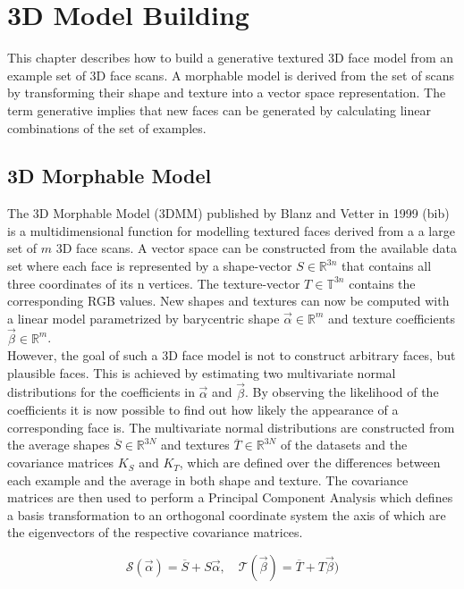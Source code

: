 \chapter{3D Model Building}
This chapter describes how to build a generative textured 3D face model from an example set of 3D face scans. A morphable model is derived from the set of scans by transforming their shape and texture into a vector space representation. The term generative implies that new faces can be generated by calculating linear combinations of the set of examples. 

\section{3D Morphable Model}
The 3D Morphable Model (3DMM) published by Blanz and Vetter in 1999 (bib) is a multidimensional function for modelling textured faces derived from a a large set of $m$ 3D face scans. A vector space can be constructed from the available data set where each face is represented by a shape-vector $S \in \mathbb{R}^{3n}$ that contains all three coordinates of its n vertices. The texture-vector $T \in \mathbb{T}^{3n}$ contains the corresponding RGB values. New shapes and textures can now be computed
with a linear model parametrized by barycentric shape $\vec\alpha \in \mathbb{R}^{m}$ and texture coefficients $\vec\beta \in \mathbb{R}^{m}$.\\
However, the goal of such a 3D face model is not to construct arbitrary faces, but plausible faces. This is achieved by estimating two multivariate normal distributions for the coefficients in $\vec\alpha$ and $\vec\beta$.
By observing the likelihood of the coefficients it is now possible to find out how likely the appearance of a corresponding face is.
The multivariate normal distributions are constructed from the average shapes $\overline{S} \in \mathbb{R}^{3N}$ and textures $\overline{T} \in \mathbb{R}^{3N}$ of the datasets and the covariance matrices $K_{S}$ and $K_{T}$, which are defined over the differences between each example and the average in both shape and texture.
The covariance matrices are then used to perform a Principal Component Analysis which defines a basis transformation to an orthogonal coordinate system the axis of which are the eigenvectors of the respective covariance matrices.

\begin{equation}
\label{eq:MM}
\mathcal{S}(\vec\alpha)=\overline{S}+S\vec\alpha, \quad \mathcal{T}(\vec\beta)=\overline{T}+T\vec\beta)
\end{equation}

